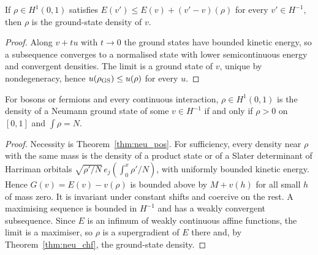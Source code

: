 \begin{theorem}
  \label{thm:neu_chf}
  \leanok
  If $\rho\in H^1(0,1)$ satisfies $E(v')\le E(v)+(v'-v)(\rho)$ for every $v'\in H^{-1}$, then $\rho$ is the ground-state density
  of $v$.
\end{theorem}
\begin{proof}
  \leanok
  Along $v+tu$ with $t\to0$ the ground states have bounded kinetic energy, so a subsequence converges to a normalised state
  with lower semicontinuous energy and convergent densities. The limit is a ground state of $v$, unique by nondegeneracy,
  hence $u(\rho_{\rm GS})\le u(\rho)$ for every $u$.
\end{proof}

\begin{theorem}
  \label{thm:neu_corso}
  \leanok
  For bosons or fermions and every continuous interaction, $\rho\in H^1(0,1)$ is the density of a Neumann ground state of some
  $v\in H^{-1}$ if and only if $\rho>0$ on $[0,1]$ and $\int\rho=N$.
\end{theorem}
\begin{proof}
  \leanok
  Necessity is Theorem~\ref{thm:neu_pos}. For sufficiency, every density near $\rho$ with the same mass is the density of a
  product state or of a Slater determinant of Harriman orbitals $\sqrt{\rho'/N}\,e_j\!\left(\int_0^x\rho'/N\right)$, with
  uniformly bounded kinetic energy. Hence $G(v)=E(v)-v(\rho)$ is bounded above by $M+v(h)$ for all small $h$ of mass zero.
  It is invariant under constant shifts and coercive on the rest. A maximising sequence is bounded in $H^{-1}$ and has a
  weakly convergent subsequence. Since $E$ is an infimum of weakly continuous affine functions, the limit is a maximiser,
  so $\rho$ is a supergradient of $E$ there and, by Theorem~\ref{thm:neu_chf}, the ground-state density.
\end{proof}

